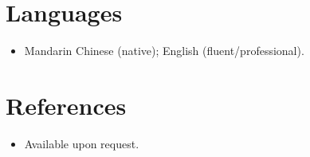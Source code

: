 \documentclass[11pt,a4paper,sans]{moderncv}
\begin{document}

\section{Languages}
\vspace{1pt}
\begin{itemize}
\item{Mandarin Chinese (native); English (fluent/professional).}
\end{itemize}


\section{References}
\vspace{1pt}
\begin{itemize}
\item{Available upon request.}
\end{itemize}
\end{document}
